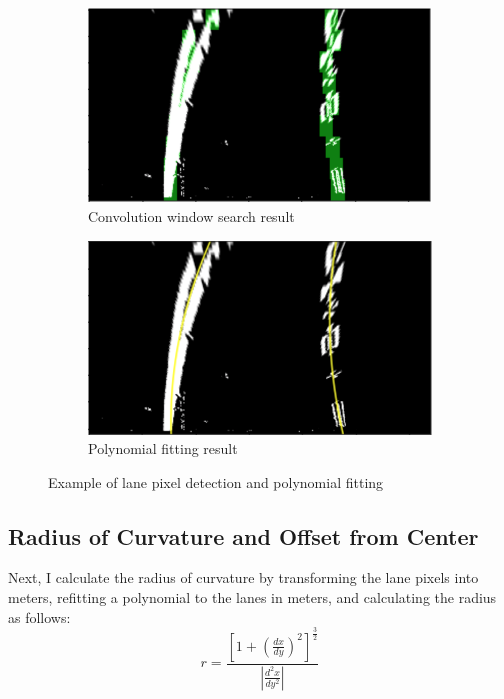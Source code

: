 \documentclass[12pt]{article}
\begin{document}
\begin{figure}[h]
\centering
\begin{subfigure}{.5\textwidth}
  \centering
  \includegraphics[width=1\linewidth]{window_test.png}
  \caption{Convolution window search result}
\end{subfigure}%
\begin{subfigure}{.5\textwidth}
  \centering
  \includegraphics[width=1\linewidth]{polyfit_test.png}
  \caption{Polynomial fitting result}
\end{subfigure}
\caption{Example of lane pixel detection and polynomial fitting}
\label{fig:lane_pixels}
\end{figure}

\subsection{Radius of Curvature and Offset from Center}
Next, I calculate the radius of curvature by transforming the lane pixels into meters, refitting a polynomial to the lanes in meters, and calculating the radius as follows:
\begin{equation}
r = \frac{[1+(\frac{dx}{dy})^2]^\frac{3}{2}}{|\frac{d^2x}{dy^2}|}
\label{eq:radius}
\end{equation}
\end{document}
